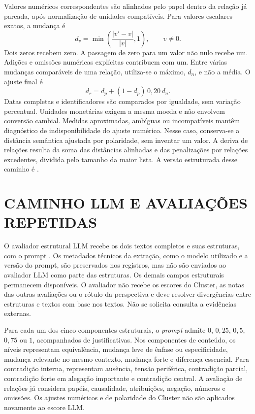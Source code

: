 Valores numéricos correspondentes são alinhados pelo papel dentro da relação já pareada, após normalização de unidades compatíveis. Para valores escalares exatos, a mudança é
\begin{equation}
 d_v = \min\left(\frac{|v'-v|}{|v|},1\right), \qquad v\ne 0.
 \label{eq:cluster-numerico}
\end{equation}
Dois zeros recebem zero. A passagem de zero para um valor não nulo recebe um. Adições e omissões numéricas explícitas contribuem com um. Entre várias mudanças comparáveis de uma relação, utiliza-se o máximo, $d_n$, e não a média. O ajuste final é
\begin{equation}
 d_r = d_p + (1-d_p)\,0{,}20\,d_n.
 \label{eq:cluster-relacao}
\end{equation}
Datas completas e identificadores são comparados por igualdade, sem variação percentual. Unidades monetárias exigem a mesma moeda e não envolvem conversão cambial. Medidas aproximadas, ambíguas ou incompatíveis mantêm diagnóstico de indisponibilidade do ajuste numérico. Nesse caso, conserva-se a distância semântica ajustada por polaridade, sem inventar um valor. A deriva de relações resulta da soma das distâncias alinhadas e das penalizações por relações excedentes, dividida pelo tamanho da maior lista. A versão estruturada desse caminho é .

\section{CAMINHO LLM E AVALIAÇÕES REPETIDAS}

O avaliador estrutural LLM recebe os dois textos completos e suas estruturas, com o prompt . Os metadados técnicos da extração, como o modelo utilizado e a versão do prompt, são preservados nos registros, mas não são enviados ao avaliador LLM como parte das estruturas. Os demais campos estruturais permanecem disponíveis. O avaliador não recebe os escores do Cluster, as notas das outras avaliações ou o rótulo da perspectiva e deve resolver divergências entre estruturas e textos com base nos textos. Não se solicita consulta a evidências externas.

Para cada um dos cinco componentes estruturais, o \textit{prompt} admite $0$, $0{,}25$, $0{,}5$, $0{,}75$ ou $1$, acompanhados de justificativas. Nos componentes de conteúdo, os níveis representam equivalência, mudança leve de ênfase ou especificidade, mudança relevante no mesmo contexto, mudança forte e diferença essencial. Para contradição interna, representam ausência, tensão periférica, contradição parcial, contradição forte em alegação importante e contradição central. A avaliação de relações já considera papéis, causalidade, atribuições, negação, números e omissões. Os ajustes numéricos e de polaridade do Cluster não são aplicados novamente ao escore LLM.


